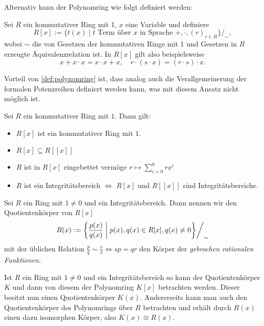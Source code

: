 \begin{remark}
    Alternativ kann der Polynomring wie folgt definiert werden:

    Sei $R$ ein kommutativer Ring mit 1, $x$ eine Variable und definiere
    $$ R[x] := \{ t(x) \mid t \text{ Term über $x$ in Sprache } +, \cdot, (r)_{r \in R} \}/_\sim, $$
    wobei $\sim$ die von Gesetzen der kommutativen Ringe mit 1 und Gesetzen in $R$ erzeugte Äquivalenz\-relation ist. In $R[x]$ gilt also beispielsweise
    $$ x + x \cdot x = x \cdot x + x, \quad r \cdot (s \cdot x) = (r \cdot s) \cdot x. $$

    Vorteil von \cref{def:polynomring} ist, dass analog auch die Verallgemeinerung der formalen Potenzreihen definiert werden kann, was mit diesem Ansatz nicht möglich ist.
\end{remark}

\begin{proposition}\label{prop:polynomringe}
    Sei $R$ ein kommutativer Ring mit $1$. Dann gilt:
    \begin{itemize}
        \item $R[{x}]$ ist ein kommutativer Ring mit $1$.
        \item $R[x]\subseteq R[[x]]$
        \item $R$ ist in $R[x]$ eingebettet vermöge $r\mapsto \sum_{i=0}^0rx^i$
        \item $R$ ist ein Integritätsbereich $\Leftrightarrow$ $R[x]$ und $R[[x]]$ sind Integritätsbereiche.
    \end{itemize}
\end{proposition}

\begin{definition}
    Sei $R$ ein Ring mit $1\neq 0$ und ein Integritätsbereich. Dann nennen wir den Quotientenkörper von $R[x]$ 
    $$R(x):=\left\{\frac{p(x)}{q(x)}\;\middle|\;p(x),q(x)\in R[x],q(x)\neq 0\middle\}\right/_\sim$$
    mit der üblichen Relation $\frac{p}{q}\sim \frac{r}{s}\Leftrightarrow sp=qr$ den Körper der \emph{gebrochen rationalen Funktionen}.
\end{definition}

\begin{remark}
    Ist $R$ ein Ring mit $1\neq 0$ und ein Integritätsbereich so kann der Quotientenk\"orper $K$ und dann von diesem
    der Polynomring $K[x]$ betrachten werden. Dieser besitzt nun einen Quotientenk\"orper $K(x)$. Andererseits
    kann man auch den Quotientenk\"orper des Polynomrings über $R$ betrachten und erhält durch $R(x)$ einen dazu isomorphen Körper,
    also $K(x)\cong R(x)$.
\end{remark}

